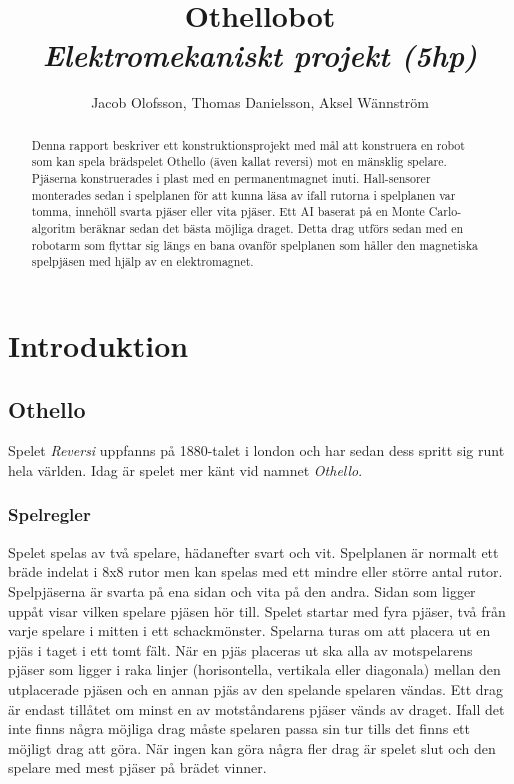 \documentclass[a4paper]{article}
\begin{document}
\title{
	\textbf{Othellobot}\\
	\textit{Elektromekaniskt projekt (5hp)}
}
\author{Jacob Olofsson, Thomas Danielsson, Aksel Wännström}
\maketitle

\pagebreak

\begin{abstract}
Denna rapport beskriver ett konstruktionsprojekt med mål att konstruera en robot som kan spela brädspelet Othello (även kallat reversi) mot en mänsklig spelare.
Pjäserna konstruerades i plast med en permanentmagnet inuti.
Hall-sensorer monterades sedan i spelplanen för att kunna läsa av ifall rutorna i spelplanen var tomma, innehöll svarta pjäser eller vita pjäser.
Ett AI baserat på en Monte Carlo-algoritm beräknar sedan det bästa möjliga draget.
Detta drag utförs sedan med en robotarm som flyttar sig längs en bana ovanför spelplanen som håller den magnetiska spelpjäsen med hjälp av en elektromagnet.
\end{abstract}

\tableofcontents

\pagebreak
{}

\section{Introduktion}
\subsection{Othello}
Spelet \textit{Reversi} uppfanns på 1880-talet i london och har sedan dess spritt sig runt hela världen.
Idag är spelet mer känt vid namnet \textit{Othello}.

\subsubsection{Spelregler}
Spelet spelas av två spelare, hädanefter svart och vit.
Spelplanen är normalt ett bräde indelat i 8x8 rutor men kan spelas med ett mindre eller större antal rutor.
Spelpjäserna är svarta på ena sidan och vita på den andra.
Sidan som ligger uppåt visar vilken spelare pjäsen hör till.
Spelet startar med fyra pjäser, två från varje spelare i mitten i ett schackmönster.
Spelarna turas om att placera ut en pjäs i taget i ett tomt fält.
När en pjäs placeras ut ska alla av motspelarens pjäser som ligger i raka linjer (horisontella, vertikala eller diagonala) mellan den utplacerade pjäsen och en annan pjäs av den spelande spelaren vändas.
Ett drag är endast tillåtet om minst en av motståndarens pjäser vänds av draget.
Ifall det inte finns några möjliga drag måste spelaren passa sin tur tills det finns ett möjligt drag att göra.
När ingen kan göra några fler drag är spelet slut och den spelare med mest pjäser på brädet vinner.
\end{document}
